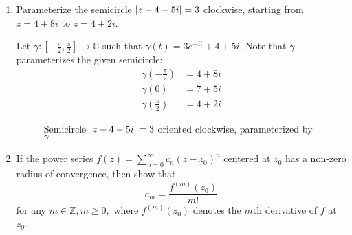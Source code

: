 \documentclass[notoc,notitlepage]{tufte-book}
\begin{document}
\begin{enumerate}
	\item Parameterize the semicircle $\left|z - 4 - 5i\right| = 3$ clockwise, starting from $z = 4 + 8i$ to $z = 4 + 2i$.

		\begin{solution}
			Let $\gamma: [-\frac{\pi}{2}, \frac{\pi}{2}] \to \mathbb{C}$ such that $\gamma(t) = 3e^{-it} + 4 + 5i$. Note that $\gamma$ parameterizes the given semicircle:
			\begin{align*}
				\gamma\left(-\frac{\pi}{2}\right) &= 4 + 8i \\
				\gamma(0) &= 7 + 5i \\
				\gamma\left(\frac{\pi}{2} \right) &= 4 + 2i
			\end{align*}
			\begin{figure}
				\begin{center}
				\end{center}
				\caption[loftitle]{Semicircle $\left|z - 4 - 5i\right| = 3$ oriented clockwise, parameterized by $\gamma$}
			\end{figure}
		\end{solution}

	\item If the power series $f(z) = \sum_{n=0}^{\infty} c_n (z - z_0)^n$ centered at $z_0$ has a non-zero radius of convergence, then show that
		\begin{equation*}
			c_m = \frac{f^{(m)}(z_0)}{m!}
		\end{equation*}
		for any $m \in \mathbb{Z}, m \geq 0,$ where $f^{(m)}(z_0)$ denotes the $m$th derivative of $f$ at $z_0$. \label{item:tutorial_q2}


\end{enumerate}
\end{document}
